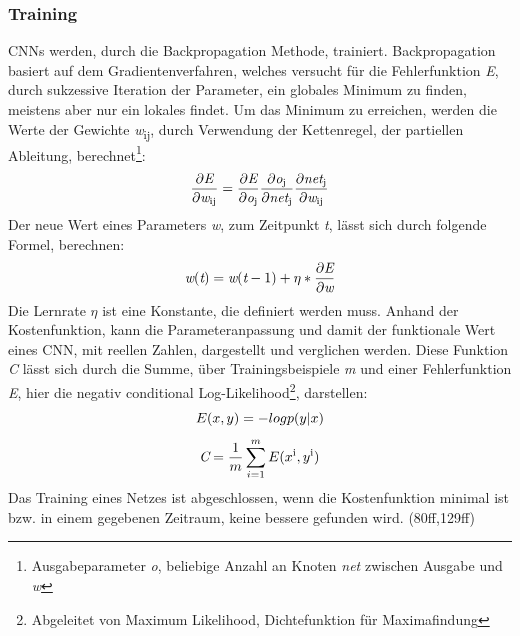 \documentclass[twosided,a4,10pt]{article}
\begin{document}
\begin{multicols}{2}
		\subsubsection{Training}
		CNNs werden, durch die Backpropagation Methode, trainiert. Backpropagation basiert auf dem Gradientenverfahren, welches versucht für die Fehlerfunktion \textit{E}, durch sukzessive Iteration der Parameter, ein globales Minimum zu finden, meistens aber nur ein lokales findet. Um das Minimum zu erreichen, werden die Werte der Gewichte \textit{w}\textsubscript{ij}, durch Verwendung der Kettenregel, der partiellen Ableitung, berechnet\footnote[12]{Ausgabeparameter \textit{o}, beliebige Anzahl an Knoten \textit{net} zwischen Ausgabe und \textit{w}}:
		\begin{equation*}
		\centering
		\frac{\partial\textit{E}}{\partial\textit{w}\textsubscript{ij}} = \frac{\partial\textit{E}}{\partial\textit{o}\textsubscript{j}} \frac{\partial\textit{o}\textsubscript{j}}{\partial\textit{net}\textsubscript{j}}  \frac{\partial\textit{net}\textsubscript{j}}{\partial\textit{w}\textsubscript{ij}} 
		\end{equation*}\newline
		Der neue Wert eines Parameters \textit{w}, zum Zeitpunkt \textit{t}, lässt sich durch folgende Formel, berechnen:
		\begin{equation*}
		\centering
		\textit{w}(\textit{t}) = \textit{w}(\textit{t}-1) + \eta * \frac{\partial\textit{E}}{\partial\textit{w}} 
		\end{equation*}
		Die Lernrate $\eta$ ist eine Konstante, die definiert werden muss.\newline
		Anhand der Kostenfunktion, kann die Parameteranpassung und damit der funktionale Wert eines CNN, mit reellen Zahlen, dargestellt und verglichen werden. Diese Funktion \textit{C} lässt sich durch die Summe, über Trainingsbeispiele \textit{m} und einer Fehlerfunktion \textit{E}, hier die negativ conditional Log-Likelihood\footnote[13]{Abgeleitet von Maximum Likelihood, Dichtefunktion für Maximafindung}, darstellen: 
		\begin{equation*}
		\centering
		E(x,y) = -log p(y|x)
		\end{equation*}
		\begin{equation*}
		\centering
		\textit{C} = \frac{1}{m}\sum_{i=1}^{m}E(x\textsuperscript{i},y\textsuperscript{i})
		\end{equation*}
		Das Training eines Netzes ist abgeschlossen, wenn die Kostenfunktion minimal ist bzw. in einem gegebenen Zeitraum, keine bessere gefunden wird. \cite{goodfellow}(80ff,129ff)
		

\end{multicols}
\end{document}
